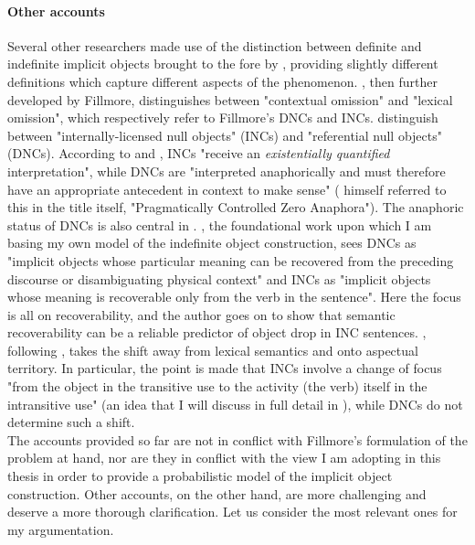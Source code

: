 \paragraph{Other accounts}
Several other researchers made use of the distinction between definite and indefinite implicit objects brought to the fore by \textcite{Fillmore1986}, providing slightly different definitions which capture different aspects of the phenomenon. \textcite{Allerton1975}, then further developed by Fillmore, distinguishes between "contextual omission" and "lexical omission", which respectively refer to Fillmore's DNCs and INCs. \textcite{CumminsRoberge2004} distinguish between "internally-licensed null objects" (INCs) and "referential null objects" (DNCs). According to \textcite{ruppenhofer2005regularities} and \textcite[30]{PethoKardos2006}, INCs "receive an \textit{existentially quantified} interpretation", while DNCs are "interpreted anaphorically and must therefore have an appropriate antecedent in context to make sense" (\textcite{Fillmore1986} himself referred to this in the title itself, "Pragmatically Controlled Zero Anaphora"). The anaphoric status of DNCs is also central in \textcite{KellerLapata1998}. \textcite[13]{Medina2007}, the foundational work upon which I am basing my own model of the indefinite object construction, sees DNCs as "implicit objects whose particular meaning can be recovered from the preceding discourse or disambiguating physical context" and INCs as "implicit objects whose meaning is recoverable only from the verb in the sentence". Here the focus is all on recoverability, and the author goes on to show that semantic recoverability can be a reliable predictor of object drop in INC sentences. \textcite[293]{Liu2008}, following \textcite{Garcia-VelascoMunoz2002}, takes the shift away from lexical semantics and onto aspectual territory. In particular, the point is made that INCs involve a change of focus "from the object in the transitive use to the activity (the verb) itself in the intransitive use" (an idea that I will discuss in full detail in ), while DNCs do not determine such a shift.\\
The accounts provided so far are not in conflict with Fillmore's formulation of the problem at hand, nor are they in conflict with the view I am adopting in this thesis in order to provide a probabilistic model of the implicit object construction. Other accounts, on the other hand, are more challenging and deserve a more thorough clarification. Let us consider the most relevant ones for my argumentation.\\
